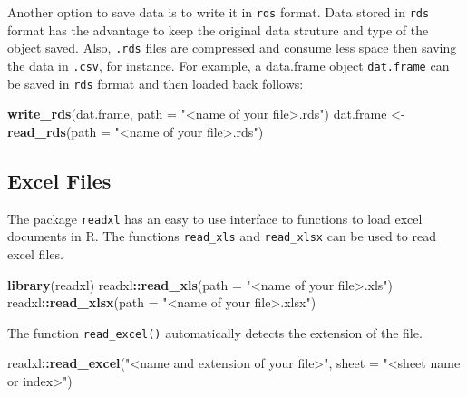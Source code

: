 \documentclass[]{book}
\newenvironment{Shaded}{\begin{snugshade}}{\end{snugshade}}
\newcommand{\KeywordTok}[1]{\textcolor[rgb]{0.13,0.29,0.53}{\textbf{#1}}}
\newcommand{\DataTypeTok}[1]{\textcolor[rgb]{0.13,0.29,0.53}{#1}}
\newcommand{\StringTok}[1]{\textcolor[rgb]{0.31,0.60,0.02}{#1}}
\newcommand{\OperatorTok}[1]{\textcolor[rgb]{0.81,0.36,0.00}{\textbf{#1}}}
\newcommand{\NormalTok}[1]{#1}
\begin{document}
Another option to save data is to write it in \texttt{rds} format. Data
stored in \texttt{rds} format has the advantage to keep the original
data struture and type of the object saved. Also, \texttt{.rds} files
are compressed and consume less space then saving the data in
\texttt{.csv}, for instance. For example, a data.frame object
\texttt{dat.frame} can be saved in \texttt{rds} format and then loaded
back follows:

\begin{Shaded}
\begin{Highlighting}[]
\KeywordTok{write_rds}\NormalTok{(dat.frame, }\DataTypeTok{path =} \StringTok{"<name of your file>.rds"}\NormalTok{)}
\NormalTok{dat.frame <-}\StringTok{ }\KeywordTok{read_rds}\NormalTok{(}\DataTypeTok{path =} \StringTok{"<name of your file>.rds"}\NormalTok{)}
\end{Highlighting}
\end{Shaded}

\subsection{Excel Files}\label{excel-files}

The package \texttt{readxl} has an easy to use interface to functions to
load excel documents in R. The functions \texttt{read\_xls} and
\texttt{read\_xlsx} can be used to read excel files.

\begin{Shaded}
\begin{Highlighting}[]
\KeywordTok{library}\NormalTok{(readxl)}
\NormalTok{readxl}\OperatorTok{::}\KeywordTok{read_xls}\NormalTok{(}\DataTypeTok{path =} \StringTok{"<name of your file>.xls"}\NormalTok{)}
\NormalTok{readxl}\OperatorTok{::}\KeywordTok{read_xlsx}\NormalTok{(}\DataTypeTok{path =} \StringTok{"<name of your file>.xlsx"}\NormalTok{)}
\end{Highlighting}
\end{Shaded}

The function \texttt{read\_excel()} automatically detects the extension
of the file.

\begin{Shaded}
\begin{Highlighting}[]
\NormalTok{readxl}\OperatorTok{::}\KeywordTok{read_excel}\NormalTok{(}\StringTok{"<name and extension of your file>"}\NormalTok{, }\DataTypeTok{sheet =} \StringTok{"<sheet name or index>"}\NormalTok{)}
\end{Highlighting}
\end{Shaded}
\end{document}
